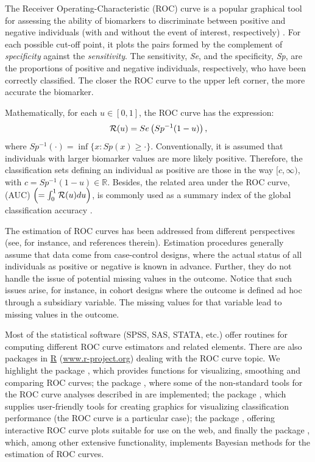 The Receiver Operating-Characteristic (ROC) curve is a popular graphical tool for assessing the ability of biomarkers to discriminate between positive and negative individuals (with and without the event of interest, respectively)  \citep{Zhou2002, Pepe2003}. For each possible cut-off point, it plots the pairs formed by the complement of {\it specificity} against the {\it  sensitivity}. The sensitivity, {\it {Se}}, and the specificity, {\it {Sp}}, are the proportions of positive and negative individuals, respectively, who have been correctly classified.
The closer the ROC curve to the upper left corner, the more accurate the biomarker.

Mathematically, for each $u\in [0,1]$, the ROC curve has the expression:
\begin{equation}
{\cal R}(u)= Se\left(Sp^{-1}(1-u)\right), \label{R11}
\end{equation}
where $Sp^{-1}(\cdot) = \inf \{x: Sp(x) \geq \cdot\} $. Conventionally, it is assumed that individuals with larger biomarker values are more likely positive. Therefore, the classification sets defining an individual as positive are those in the way $[c, \infty)$, with  $c = Sp^{-1}(1-u) \in\mathbb{R} $. Besides, the related area under the ROC curve, (AUC) $\left(=\int_{0}^{1}{{\cal R}(u)du}\right)$, is commonly used as a summary index of the global classification accuracy \citep{hanl82}. 

The estimation of ROC curves has been addressed from different perspectives (see, for instance, \citet{gon14} and references therein). Estimation procedures generally assume that data come from case-control designs, where the actual status of all individuals as positive or negative is known in advance. Further, they do not handle the issue of potential missing values in the outcome. Notice that such issues arise, for instance, in cohort designs where the outcome is defined ad hoc through a subsidiary variable. The missing values for that variable lead to missing values in the outcome.

Most of the statistical software (SPSS, SAS, STATA, etc.) offer routines for computing different ROC curve estimators and related elements. There are also packages in \url{R} (\url{www.r-project.org}) dealing with the ROC curve topic. We highlight the  package \citep{robin11},  which provides functions for visualizing, smoothing and comparing ROC curves; the package  \citep{nsROC}, where some of the non-standard tools for the ROC curve analyses described in \citet{Perez-Fernandez2018}  are implemented; the package  \citep{ROCR}, which supplies user-friendly tools for creating graphics for visualizing classification performance (the ROC curve is a particular case); the  package \citep{Sachs2017}, offering interactive ROC curve plots suitable for use on the web, and finally the  package \citep{Cote2021}, which, among other extensive functionality, implements Bayesian methods for the estimation of ROC curves.

